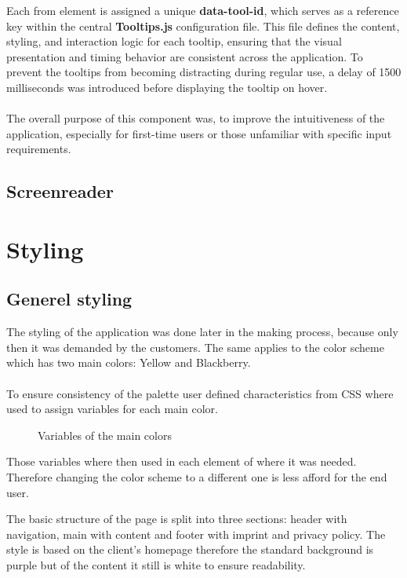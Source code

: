 \documentclass[a4paper,12pt]{report}
\begin{document}
Each from element is assigned a unique \textbf{data-tool-id}, which serves as a reference key within the central \textbf{Tooltips.js} configuration file. This file defines the content, styling, and interaction logic for each tooltip, ensuring that the visual presentation and timing behavior are consistent across the application. To prevent the tooltips from becoming distracting during regular use, a delay of 1500 milliseconds was introduced before displaying the tooltip on hover.\\\\


The overall purpose of this component was, to improve the intuitiveness of the application, especially for first-time users or those unfamiliar with specific input requirements.
\subsection{Screenreader}
\section{Styling}
\subsection{Generel styling}
The styling of the application was done later in the making process, because only then it was demanded by the customers. The same applies to the color scheme which has two main colors: Yellow and Blackberry. \\ \\
To ensure consistency of the palette user defined characteristics from CSS where used to assign variables for each main color. \parencite{csscolorvariables}
\begin{figure}[h!]
	\caption{Variables of the main colors}
	\label{fig:user_defined_characteristics}
\end{figure}

Those variables where then used in each element of where it was needed. Therefore changing the color scheme to a different one is less afford for the end user.

The basic structure of the page is split into three sections: header with navigation, main with content and footer with imprint and privacy policy. The style is based on the client's homepage therefore the standard background is purple but of the content it still is white to ensure readability. \parencite{lmppage}
\end{document}
